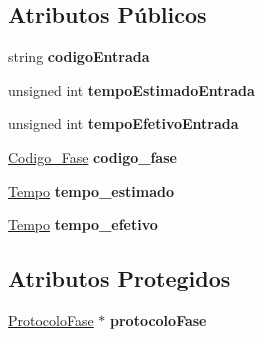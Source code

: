 \subsection*{\-Atributos \-Públicos}
\begin{DoxyCompactItemize}
\item 
\hypertarget{class_cntr_int_fase_a0f718c4e96030b2724ff182b19a5be16}{
string {\bfseries codigo\-Entrada}}
\label{class_cntr_int_fase_a0f718c4e96030b2724ff182b19a5be16}

\item 
\hypertarget{class_cntr_int_fase_a3512796b953443e8e9fd93947e48553d}{
unsigned int {\bfseries tempo\-Estimado\-Entrada}}
\label{class_cntr_int_fase_a3512796b953443e8e9fd93947e48553d}

\item 
\hypertarget{class_cntr_int_fase_ac532bf08b7e575ad964138534c6feeb9}{
unsigned int {\bfseries tempo\-Efetivo\-Entrada}}
\label{class_cntr_int_fase_ac532bf08b7e575ad964138534c6feeb9}

\item 
\hypertarget{class_cntr_int_fase_af6cb3c189d0fc074e878d94900572bb6}{
\hyperlink{class_codigo___fase}{\-Codigo\-\_\-\-Fase} {\bfseries codigo\-\_\-fase}}
\label{class_cntr_int_fase_af6cb3c189d0fc074e878d94900572bb6}

\item 
\hypertarget{class_cntr_int_fase_a382a7f46bed01f2acf3b56c6bc42f917}{
\hyperlink{class_tempo}{\-Tempo} {\bfseries tempo\-\_\-estimado}}
\label{class_cntr_int_fase_a382a7f46bed01f2acf3b56c6bc42f917}

\item 
\hypertarget{class_cntr_int_fase_a4607c62f5939e390212b0907a72ff840}{
\hyperlink{class_tempo}{\-Tempo} {\bfseries tempo\-\_\-efetivo}}
\label{class_cntr_int_fase_a4607c62f5939e390212b0907a72ff840}

\end{DoxyCompactItemize}
\subsection*{\-Atributos \-Protegidos}
\begin{DoxyCompactItemize}
\item 
\hypertarget{class_cntr_int_fase_a26ae222e012957ddeb47c446b0dd2cad}{
\hyperlink{class_protocolo_fase}{\-Protocolo\-Fase} $\ast$ {\bfseries protocolo\-Fase}}
\label{class_cntr_int_fase_a26ae222e012957ddeb47c446b0dd2cad}

\end{DoxyCompactItemize}


